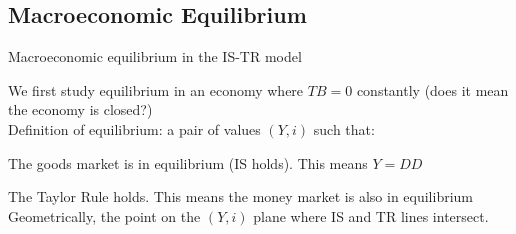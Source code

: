 \documentclass{beamer}
\newenvironment{mynumerate}
{\vfill\enumerate[nolistsep,itemsep=\fill,label=\arabic*.]}
  {\endenumerate}
\begin{document}
\subsection{Macroeconomic Equilibrium}
\begin{frame}{Macroeconomic equilibrium in the IS-TR model}

We first study equilibrium in an economy where $TB=0$ constantly \textcolor{mint}{(does it mean the economy is closed?)} \\
\vfill
Definition of equilibrium: a pair of values $(Y, i)$ such that:
\begin{mynumerate}
\item   The goods market is in equilibrium (IS holds). This means $Y = DD$  
\item The Taylor Rule holds. This means the money market is also in equilibrium
\end{mynumerate}
\vfill
Geometrically, the point on the $(Y, i)$ plane where IS and TR lines intersect.
\end{frame}
\end{document}
